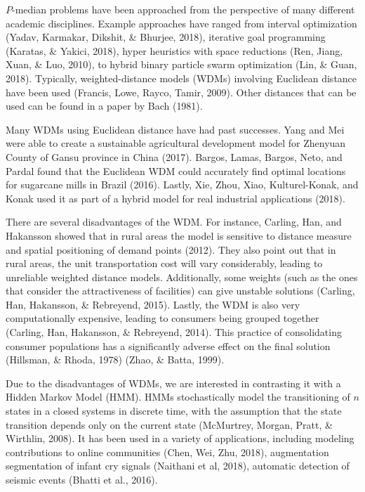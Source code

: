 \documentclass[twoside,twocolumn]{article}
\begin{document}
$P$-median problems have been approached from the perspective of many different academic disciplines.
Example approaches have ranged from interval optimization (Yadav, Karmakar, Dikshit, \& Bhurjee, 2018), iterative goal programming (Karatas, \& Yakici, 2018), hyper heuristics with space reductions (Ren, Jiang, Xuan, \& Luo, 2010), to hybrid binary particle swarm optimization (Lin, \& Guan, 2018).
Typically, weighted-distance models (WDMs) involving Euclidean distance have been used (Francis, Lowe, Rayco, Tamir, 2009).
Other distances that can be used can be found in a paper by Bach (1981).

Many WDMs using Euclidean distance have had past successes.
Yang and Mei were able to create a sustainable agricultural development model for Zhenyuan County of Gansu province in China (2017).
Bargos, Lamas, Bargos, Neto, and Pardal found that the Euclidean WDM could accurately find optimal locations for sugarcane mills in Brazil (2016).
Lastly, Xie, Zhou, Xiao, Kulturel-Konak, and Konak used it as part of a hybrid model for real industrial applications (2018).

There are several disadvantages of the WDM.
For instance, Carling, Han, and Hakansson showed that in rural areas the model is sensitive to distance measure and spatial positioning of demand points (2012).
They also point out that in rural areas, the unit transportation cost will vary considerably, leading to unreliable weighted distance models.
Additionally, some weights (such as the ones that consider the attractiveness of facilities) can give unstable solutions (Carling, Han, Hakansson, \& Rebreyend, 2015).
Lastly, the WDM is also very computationally expensive, leading to consumers being grouped together (Carling, Han, Hakansson, 
\& Rebreyend, 2014). 
This practice of consolidating consumer populations has a significantly adverse effect on the final solution (Hillsman, \& Rhoda, 1978) (Zhao, \& Batta, 1999).

Due to the disadvantages of WDMs, we are interested in contrasting it with a Hidden Markov Model (HMM).
HMMs stochastically model the transitioning of $n$ states in a closed systems in discrete time, with the assumption that the state transition depends only on the current state (McMurtrey, Morgan, Pratt, \& Wirthlin, 2008).
It has been used in a variety of applications, including modeling contributions to online communities (Chen, Wei, Zhu, 2018), augmentation segmentation of infant cry signals (Naithani et al, 2018), automatic detection of seismic events (Bhatti et al., 2016).
\end{document}

